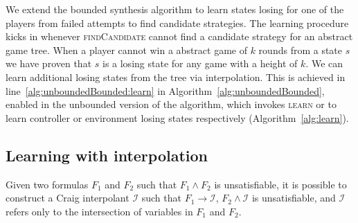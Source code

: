 


We extend the bounded synthesis algorithm to learn states losing for one of the players from failed attempts to find candidate strategies.  The learning procedure kicks in whenever \textsc{findCandidate} cannot find a candidate strategy for an abstract game tree. When a player cannot win a abstract game of $k$ rounds from a state $s$ we have proven that $s$ is a losing state for any game with a height of $k$.  We can learn additional losing states from the tree via interpolation.  This is achieved in line~\ref{alg:unboundedBounded:learn} in Algorithm~\ref{alg:unboundedBounded}, enabled in the unbounded version of the algorithm, which invokes \textsc{learn} or \textsc{} to learn controller or environment losing states respectively (Algorithm~\ref{alg:learn}).  

\subsection{Learning with interpolation}

Given two formulas $F_1$ and $F_2$ such that $F_1 \land F_2$ is unsatisfiable, it is possible to construct a Craig interpolant $\mathcal{I}$ such that $F_1 \to \mathcal{I}$, $F_2 \land \mathcal{I}$ is unsatisfiable, and $\mathcal{I}$ refers only to the intersection of variables in $F_1$ and $F_2$. 

